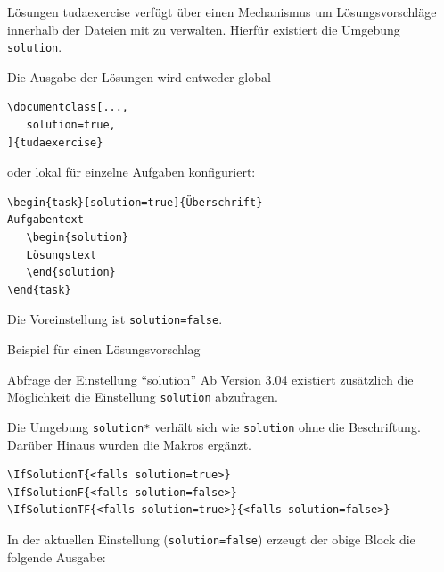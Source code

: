 \documentclass[
	ngerman,%
	accentcolor=9c,%
	points=true, für die Aktivierung der Punktereferenzen
]{tudaexercise}
\newcommand*{\code}[1]{\texttt{#1}}
\begin{document}
\begin{task}[solution=true]{Lösungen}
	tudaexercise verfügt über einen Mechanismus um Lösungsvorschläge innerhalb der Dateien mit zu verwalten. Hierfür existiert die Umgebung \code{solution}.

	Die Ausgabe der Lösungen wird entweder global
\begin{verbatim}
\documentclass[...,
   solution=true,
]{tudaexercise}
\end{verbatim}
	oder lokal für einzelne Aufgaben konfiguriert:

\begin{verbatim}
\begin{task}[solution=true]{Überschrift}
Aufgabentext
   \begin{solution}
   Lösungstext
   \end{solution}
\end{task}
\end{verbatim}
	Die Voreinstellung ist \code{solution=false}.
	\begin{solution}
		Beispiel für einen Lösungsvorschlag
	\end{solution}
\end{task}

\begin{task}{Abfrage der Einstellung \enquote{solution}}
	Ab Version 3.04 existiert zusätzlich die Möglichkeit die Einstellung \code{solution} abzufragen.

	Die Umgebung \code{solution*} verhält sich wie \code{solution} ohne die Beschriftung. Darüber Hinaus wurden die Makros \code{\IfSolutionTF} ergänzt.

\begin{verbatim}
\IfSolutionT{<falls solution=true>}
\IfSolutionF{<falls solution=false>}
\IfSolutionTF{<falls solution=true>}{<falls solution=false>}
\end{verbatim}

	In der aktuellen Einstellung (\code{solution=false}) erzeugt der obige Block die folgende Ausgabe:


\end{task}
\end{document}

